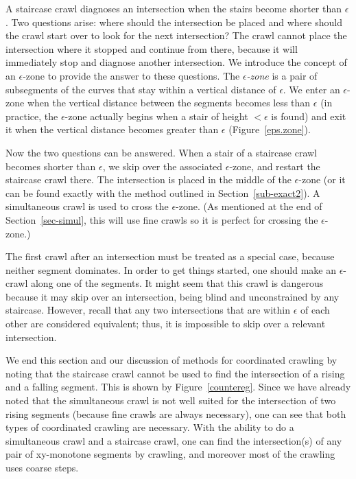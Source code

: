 A staircase crawl diagnoses an intersection when the stairs become shorter than $\epsilon$.
Two questions arise: where should the intersection be placed  and
where should the crawl start over to look for the next intersection?
The crawl cannot place the intersection where it stopped and continue
from there, because it will immediately stop and diagnose another intersection.
We introduce the concept of an $\epsilon$-zone to provide the answer to these questions.
The {\em $\epsilon$-zone} is a pair of subsegments of the curves that stay within a 
vertical distance of $\epsilon$.
We enter an $\epsilon$-zone when the vertical distance between the segments becomes
less than $\epsilon$ (in practice, the $\epsilon$-zone actually begins when a 
	stair of height $< \epsilon$ is found)
and exit it when the vertical distance becomes greater than $\epsilon$
(Figure~\ref{eps.zone}).

Now the two questions can be answered.
When a stair of a staircase crawl becomes shorter than $\epsilon$, we 
skip over the associated $\epsilon$-zone, and restart the staircase crawl there.
The intersection is placed in the middle of the $\epsilon$-zone (or it can be found exactly
with the method outlined in Section~\ref{sub-exact2}).
A simultaneous crawl is used to cross the $\epsilon$-zone.
(As mentioned at the end of Section~\ref{sec-simul}, this will use fine crawls so 
	it is perfect for crossing the $\epsilon$-zone.)


The first crawl after an intersection must be treated as a special case, because neither 
segment dominates.
In order to get things started, one should make an $\epsilon$-crawl along one of the segments.
It might seem that this crawl is dangerous because it may skip over an intersection,
being blind and unconstrained by any staircase.
However, recall that any two intersections that are within $\epsilon$ of each other
are considered equivalent;  thus, it is impossible to skip over a relevant intersection.

We end this section and our discussion of methods for coordinated crawling by noting
that the staircase crawl cannot be used to find the intersection of a rising and a 
falling segment.
This is shown by Figure~\ref{countereg}.
Since we have already noted that the simultaneous crawl is not well suited for the intersection
of two rising segments (because fine crawls are always necessary),
one can see that both types of coordinated crawling are necessary.
With the ability to do a simultaneous crawl and a staircase crawl, one can find the intersection(s)
of any pair of xy-monotone segments by crawling, and moreover most of the crawling uses coarse 
steps.

